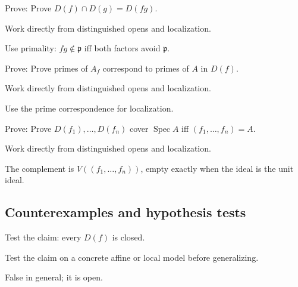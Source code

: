 \begin{exercise}[Intersection]\label{exr:vi08-expand-07}
Prove: Prove $D(f)\cap D(g)=D(fg)$.
\end{exercise}
\begin{hint}
Work directly from distinguished opens and localization.
\end{hint}
\begin{solution}
Use primality: $fg\notin\mathfrak p$ iff both factors avoid $\mathfrak p$.
\end{solution}

\begin{exercise}\label{exr:vi08-expand-08}
Prove: Prove primes of $A_f$ correspond to primes of $A$ in $D(f)$.
\end{exercise}
\begin{hint}
Work directly from distinguished opens and localization.
\end{hint}
\begin{solution}
Use the prime correspondence for localization.
\end{solution}

\begin{exercise}\label{exr:vi08-expand-09}
Prove: Prove $D(f_1),\ldots,D(f_n)$ cover $\operatorname{Spec}A$ iff $(f_1,\ldots,f_n)=A$.
\end{exercise}
\begin{hint}
Work directly from distinguished opens and localization.
\end{hint}
\begin{solution}
The complement is $V((f_1,\ldots,f_n))$, empty exactly when the ideal is the unit ideal.
\end{solution}

\subsection*{Counterexamples and hypothesis tests}

\begin{exercise}[Closed]\label{exr:vi08-expand-10}
Test the claim: every $D(f)$ is closed.
\end{exercise}
\begin{hint}
Test the claim on a concrete affine or local model before generalizing.
\end{hint}
\begin{solution}
False in general; it is open.
\end{solution}

